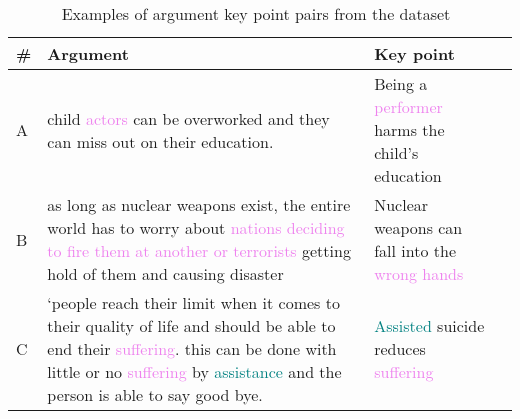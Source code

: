 \begin{table*}
    \caption{Examples of  argument key point pairs from the \ArgKP dataset~\cite{Bar-HaimEFKLS2020}}
    \label{examples}
    \begin{tabularx}{\linewidth}{lXp{4.3cm}c}
      \toprule
      \textbf{\#} & \textbf{Argument} & \textbf{Key point} \\
      \midrule
      A & %
      child \textcolor{violet}{actors} can be overworked and they can miss out on their education. & %
      Being a \textcolor{violet}{performer} harms the child's education \\ %
      B & %
      as long as nuclear weapons exist, the entire world has to worry about \textcolor{violet}{nations deciding to fire them at another or terrorists} getting hold of them and causing disaster & %
      Nuclear weapons can fall into the \textcolor{violet}{wrong hands} \\ %
      C & %
      `people reach their limit when it comes to their quality of life and should be able to end their \textcolor{violet}{suffering}. this can be done with little or no \textcolor{violet}{suffering} by \textcolor{teal}{assistance} and the person is able to say good bye. & %
      \textcolor{teal}{Assisted} suicide reduces \textcolor{violet}{suffering} \\ %
      \bottomrule
    \end{tabularx}
  \end{table*}
